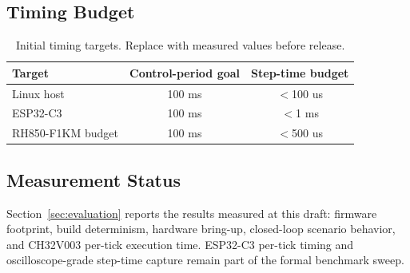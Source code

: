 \subsection{Timing Budget}

\begin{table}[h]
\centering
\begin{tabular}{lcc}
\toprule
\textbf{Target} & \textbf{Control-period goal} & \textbf{Step-time budget} \\
\midrule
Linux host & 100 ms & $<$100 us \\
ESP32-C3 & 100 ms & $<$1 ms \\
RH850-F1KM budget & 100 ms & $<$500 us \\
\bottomrule
\end{tabular}
\caption{Initial timing targets. Replace with measured values before release.}
\label{tab:timing-budget}
\end{table}

\subsection{Measurement Status}

Section~\ref{sec:evaluation} reports the results measured at this draft: firmware footprint, build determinism, hardware bring-up, closed-loop scenario behavior, and CH32V003 per-tick execution time. ESP32-C3 per-tick timing and oscilloscope-grade step-time capture remain part of the formal benchmark sweep.

\endinput
